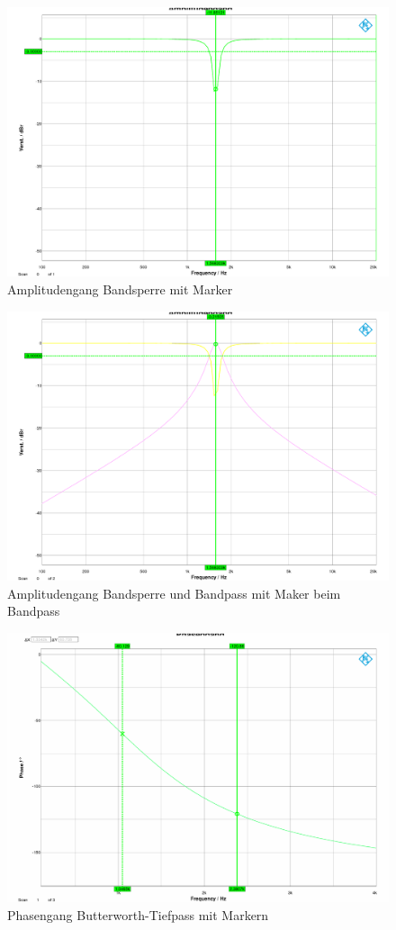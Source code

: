 \begin{figure}[h]
\centering
\includegraphics[width=0.65\linewidth]{Bilder/ImLabor/Amplitudengang_3_2_BS}
\caption{Amplitudengang Bandsperre mit Marker}
\label{fig:Amplitudengang_3_2_BS}
\end{figure}

\begin{figure}[h]
\centering
\includegraphics[width=0.65\linewidth]{Bilder/ImLabor/Amplitudengang_3_3_BP_BS}
\caption{Amplitudengang Bandsperre und Bandpass mit Maker beim Bandpass}
\label{fig:Amplitudengang_3_3_BP_BS}
\end{figure}

\begin{figure}[h]
\centering
\includegraphics[width=0.65\linewidth]{Bilder/ImLabor/Phasengang_4_1_Butter_TP}
\caption{Phasengang Butterworth-Tiefpass mit Markern}
\label{fig:Phasengang_4_1_Butter_TP}
\end{figure}

